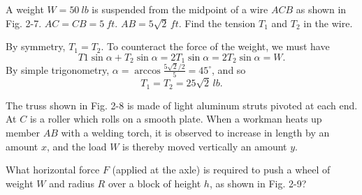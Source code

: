 \documentclass[../feynman-lectures-on-physics.tex]{subfiles}
\begin{document}
\begin{questions}
\question A weight $W=\SI{50}{lb}$ is suspended from the midpoint of a wire $ACB$ as shown in Fig. 2-7. $AC=CB=\SI{5}{ft}$. $AB=5\sqrt{2}\,\si{ft}$. Find the tension $T_1$ and $T_2$ in the wire.

\begin{solution}
	By symmetry, $T_1 = T_2$. To counteract the force of the weight, we must have 
	\[
	T1\sin\alpha + T_2\sin\alpha = 2T_1\sin\alpha = 2T_2\sin\alpha = W.
	\] 
	By simple trigonometry, $\alpha = \arccos\frac{5\sqrt{2}/2}{5} = 45^\circ$, and so
	\[
	T_1 = T_2 = 25\sqrt{2}\,\si{lb}
	.\] 
\end{solution}

\question The truss shown in Fig. 2-8 is made of light aluminum struts pivoted at each end. At $C$ is a roller which rolls on a smooth plate. When a workman heats up member $AB$ with a welding torch, it is observed to increase in length by an amount $x$, and the load $W$ is thereby moved vertically an amount $y$.

\begin{solution}
\end{solution}

\question What horizontal force $F$ (applied at the axle) is required to push a wheel of weight $W$ and radius $R$ over a block of height $h$, as shown in Fig. 2-9?


\end{questions}
\end{document}
